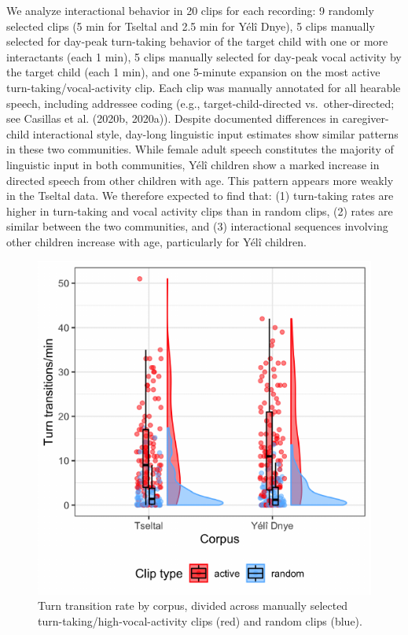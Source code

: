 \documentclass[10pt, letterpaper]{article}
\newenvironment{CodeChunk}{}{}
\begin{document}
We analyze interactional behavior in 20 clips for each recording: 9
randomly selected clips (5 min for Tseltal and 2.5 min for Yélî Dnye), 5
clips manually selected for day-peak turn-taking behavior of the target
child with one or more interactants (each 1 min), 5 clips manually
selected for day-peak vocal activity by the target child (each 1 min),
and one 5-minute expansion on the most active turn-taking/vocal-activity
clip. Each clip was manually annotated for all hearable speech,
including addressee coding (e.g., target-child-directed
vs.~other-directed; see Casillas et al. (2020b, 2020a)). Despite
documented differences in caregiver-child interactional style, day-long
linguistic input estimates show similar patterns in these two
communities. While female adult speech constitutes the majority of
linguistic input in both communities, Yélî children show a marked
increase in directed speech from other children with age. This pattern
appears more weakly in the Tseltal data. We therefore expected to find
that: (1) turn-taking rates are higher in turn-taking and vocal activity
clips than in random clips, (2) rates are similar between the two
communities, and (3) interactional sequences involving other children
increase with age, particularly for Yélî children.

\begin{CodeChunk}
\begin{figure}[h]

{\centering \includegraphics{figs/tseyel.ttr.fig-1} 

}

\caption[Turn transition rate by corpus, divided across manually selected turn-taking/high-vocal-activity clips (red) and random clips (blue)]{Turn transition rate by corpus, divided across manually selected turn-taking/high-vocal-activity clips (red) and random clips (blue).}\label{fig:tseyel.ttr.fig}
\end{figure}
\end{CodeChunk}
\end{document}
